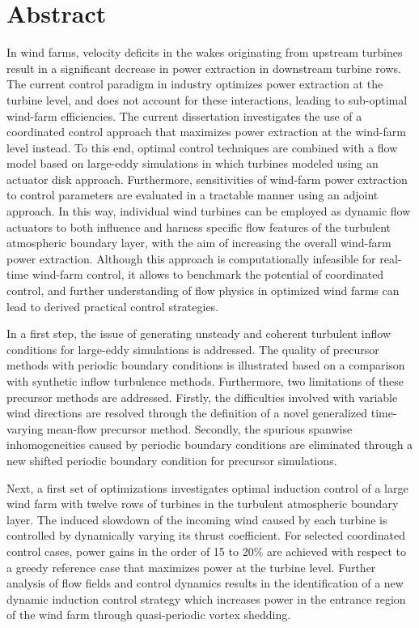 \chapter{Abstract}                                 \label{ch:abstract}

In wind farms, velocity deficits in the wakes originating from upstream turbines result in a significant decrease in power extraction in downstream turbine rows. The current control paradigm in industry optimizes power extraction at the turbine level, and does not account for these interactions, leading to sub-optimal wind-farm efficiencies. The current dissertation investigates the use of a coordinated control approach that maximizes power extraction at the wind-farm level instead. To this end, optimal control techniques are combined with a flow model based on large-eddy simulations in which turbines modeled using an actuator disk approach. Furthermore, sensitivities of wind-farm power extraction to control parameters are evaluated in a tractable manner using an adjoint approach. In this way, individual wind turbines can be employed as dynamic flow actuators to both influence and harness specific flow features of the turbulent atmospheric boundary layer, with the aim of increasing the overall wind-farm power extraction. Although this approach is computationally infeasible for real-time wind-farm control, it allows to benchmark the potential of coordinated control, and further understanding of flow physics in optimized wind farms can lead to derived practical control strategies.

In a first step, the issue of generating unsteady and coherent turbulent inflow conditions for large-eddy simulations is addressed. The quality of precursor methods with periodic boundary conditions is illustrated based on a comparison with synthetic inflow turbulence methods. Furthermore, two limitations of these precursor methods are addressed. Firstly, the difficulties involved with variable wind directions are resolved through the definition of a novel generalized time-varying mean-flow precursor method. Secondly, the spurious spanwise inhomogeneities caused by periodic boundary conditions are eliminated through a new shifted periodic boundary condition for precursor simulations. 

\clearpage
Next, a first set of optimizations investigates optimal induction control of a large wind farm with twelve rows of turbines in the turbulent atmospheric boundary layer. The induced slowdown of the incoming wind caused by each turbine is controlled by dynamically varying its thrust coefficient. For selected coordinated control cases, power gains in the order of 15 to 20\% are achieved with respect to a greedy reference case that maximizes power at the turbine level. Further analysis of flow fields and control dynamics results in the identification of a new dynamic induction control strategy which increases power in the entrance region of the wind farm through quasi-periodic vortex shedding. 

